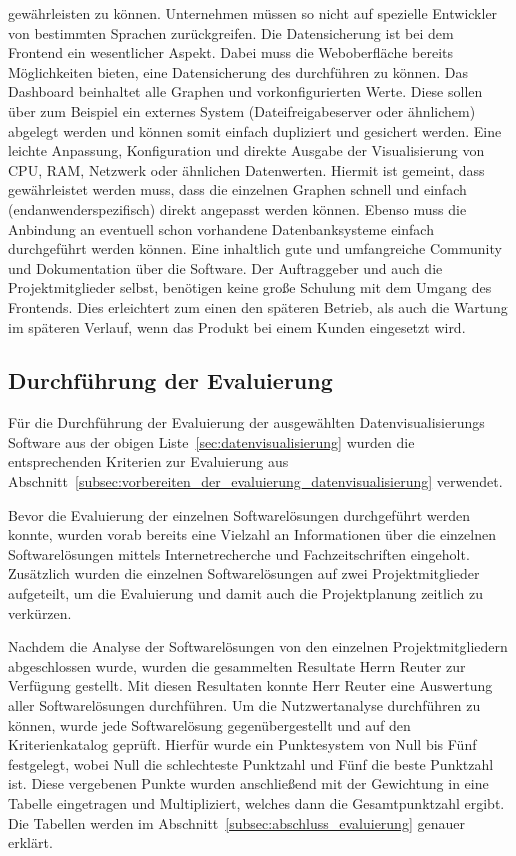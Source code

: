 \begin{outline}
  gewährleisten zu können. Unternehmen müssen so nicht auf spezielle Entwickler
  von bestimmten Sprachen zurückgreifen.
  \1 Die Datensicherung ist bei dem Frontend ein wesentlicher Aspekt. Dabei
  muss die Weboberfläche bereits Möglichkeiten bieten, eine Datensicherung des
   durchführen zu können. Das Dashboard
  beinhaltet alle Graphen und vorkonfigurierten Werte. Diese sollen über zum
  Beispiel ein externes System (Dateifreigabeserver oder ähnlichem) abgelegt
  werden und können somit einfach dupliziert und gesichert werden.
  \1 Eine leichte Anpassung, Konfiguration und direkte Ausgabe der
  Visualisierung von CPU, RAM, Netzwerk oder ähnlichen Datenwerten. Hiermit ist
  gemeint, dass gewährleistet werden muss, dass die einzelnen Graphen schnell
  und einfach (endanwenderspezifisch) direkt angepasst werden können. Ebenso
  muss die Anbindung an eventuell schon vorhandene Datenbanksysteme einfach
  durchgeführt werden können.
  \1 Eine inhaltlich gute und umfangreiche Community und Dokumentation über die
  Software. Der Auftraggeber und auch die Projektmitglieder selbst, benötigen
  keine große Schulung mit dem Umgang des Frontends. Dies erleichtert zum einen
  den späteren Betrieb, als auch die Wartung im späteren Verlauf, wenn das
  Produkt bei einem Kunden eingesetzt wird.
\end{outline}
\mr%

\subsection{Durchführung der Evaluierung}
\label{subsec:durchfuehrung_evaluierung_datenvisualisierung}
Für die Durchführung der Evaluierung der ausgewählten Datenvisualisierungs
Software aus der obigen Liste~\ref{sec:datenvisualisierung} wurden die
entsprechenden Kriterien zur Evaluierung aus
Abschnitt~\ref{subsec:vorbereiten_der_evaluierung_datenvisualisierung}
verwendet.


Bevor die Evaluierung der einzelnen Softwarelösungen durchgeführt werden
konnte, wurden vorab bereits eine Vielzahl an Informationen über die einzelnen
Softwarelösungen mittels Internetrecherche und Fachzeitschriften eingeholt.
Zusätzlich wurden die einzelnen Softwarelösungen auf zwei Projektmitglieder
aufgeteilt, um die Evaluierung und damit auch die Projektplanung zeitlich zu
verkürzen.

Nachdem die Analyse der Softwarelösungen von den einzelnen Projektmitgliedern
abgeschlossen wurde, wurden die gesammelten Resultate Herrn Reuter zur
Verfügung gestellt. Mit diesen Resultaten konnte Herr Reuter eine Auswertung
aller Softwarelösungen durchführen. Um die Nutzwertanalyse durchführen zu
können, wurde jede Softwarelösung gegenübergestellt und auf den
Kriterienkatalog geprüft. Hierfür wurde ein Punktesystem von Null bis Fünf
festgelegt, wobei Null die schlechteste Punktzahl und Fünf die beste Punktzahl
ist. Diese vergebenen Punkte wurden anschließend mit der Gewichtung in eine
Tabelle eingetragen und Multipliziert, welches dann die Gesamtpunktzahl ergibt.
Die Tabellen werden im Abschnitt~\ref{subsec:abschluss_evaluierung} genauer
erklärt.

